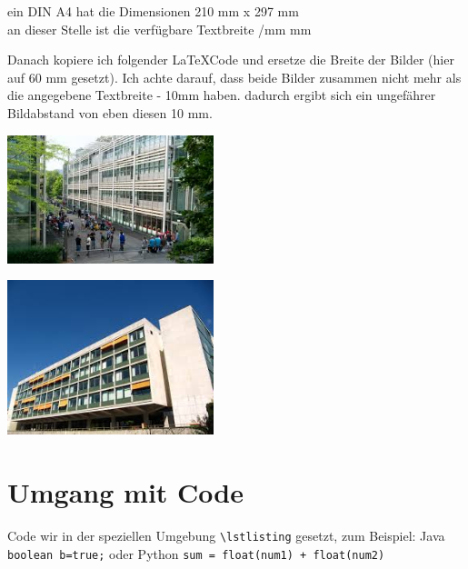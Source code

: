 \makeatletter
\def\convertto#1#2{\strip@pt\dimexpr #2*65536/\number\dimexpr 1#1}	
\makeatother

\noindent
ein DIN A4 hat die Dimensionen 210 mm x 297 mm\\
an dieser Stelle ist die verfügbare Textbreite \convertto{mm}{\the\linewidth} mm

Danach kopiere ich folgender \LaTeX Code und ersetze die Breite der Bilder (hier auf 60 mm gesetzt). Ich achte darauf, dass beide Bilder zusammen nicht mehr als die angegebene Textbreite - 10mm haben. dadurch ergibt sich ein ungefährer Bildabstand von eben diesen 10 mm.

\noindent
\begin{minipage}{0.45\linewidth}
	\centering
	\includegraphics[width=60mm]{Kapitel/Bilder/gibbBmSchulhausMitSchuelern}
	\label{fig:Testbild1}
\end{minipage}\hfill
\begin{minipage}{0.45\linewidth}
	\includegraphics[width=60mm]{Kapitel/Bilder/gibbHauptgebaude.png}
	\label{fig:Testbild2}	
\end{minipage}

\section{Umgang mit Code}

\lstset{language=TEX}
Code wir in der speziellen Umgebung \lstinline$\lstlisting$ gesetzt, zum Beispiel: Java \lstset{language=Java} \lstinline$boolean b=true;$ oder Python \lstset{language=Python} \lstinline$sum = float(num1) + float(num2)$ 

